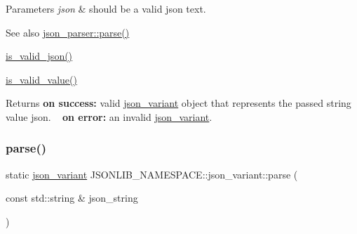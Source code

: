 \begin{DoxyParams}{Parameters}
{\em json} & should be a valid json text. \\
\hline
\end{DoxyParams}
\begin{DoxySeeAlso}{See also}
\hyperlink{classJSONLIB__NAMESPACE_1_1json__parser_a8f097c29f98ed795a92b5941c9070f8b}{json\+\_\+parser\+::parse()} 

\hyperlink{classJSONLIB__NAMESPACE_1_1json__variant_a158e3148d9256af3d1b8251b2ca7b6c4}{is\+\_\+valid\+\_\+json()} 

\hyperlink{classJSONLIB__NAMESPACE_1_1json__variant_a224aab2dd56e3928dd893be8b7f3367a}{is\+\_\+valid\+\_\+value()} 
\end{DoxySeeAlso}
\begin{DoxyReturn}{Returns}
{\bfseries on success\+:} valid \hyperlink{classJSONLIB__NAMESPACE_1_1json__variant}{json\+\_\+variant} object that represents the passed string value {\ttfamily json}. ~\newline
 {\bfseries on error\+:} an invalid \hyperlink{classJSONLIB__NAMESPACE_1_1json__variant}{json\+\_\+variant}. 
\end{DoxyReturn}
\mbox{\label{classJSONLIB__NAMESPACE_1_1json__variant_a358a8e1485bc81dbed1594ce6c5b3552}} 
\subsubsection{\texorpdfstring{parse()}{parse()}\hspace{0.1cm}{\footnotesize\ttfamily [2/2]}}
{\footnotesize\ttfamily static \hyperlink{classJSONLIB__NAMESPACE_1_1json__variant}{json\+\_\+variant} J\+S\+O\+N\+L\+I\+B\+\_\+\+N\+A\+M\+E\+S\+P\+A\+C\+E\+::json\+\_\+variant\+::parse (\begin{DoxyParamCaption}\item[{const std\+::string \&}]{json\+\_\+string }\end{DoxyParamCaption})\hspace{0.3cm}{\ttfamily [static]}}



